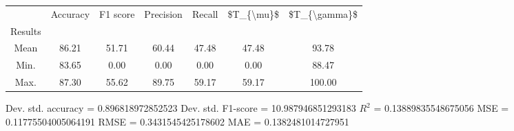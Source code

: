 \begin{tabular}{|c|c|c|c|c|c|c|}
\toprule
{} &  Accuracy &  F1 score &  Precision &  Recall &  \$T\_\{\textbackslash mu\}\$ &  \$T\_\{\textbackslash gamma\}\$ \\
Results &           &           &            &         &            &               \\
\hline
Mean    &     86.21 &     51.71 &      60.44 &   47.48 &      47.48 &         93.78 \\
Min.    &     83.65 &      0.00 &       0.00 &    0.00 &       0.00 &         88.47 \\
Max.    &     87.30 &     55.62 &      89.75 &   59.17 &      59.17 &        100.00 \\
\bottomrule
\end{tabular}

 Dev. std. accuracy = 0.896818972852523
 Dev. std. F1-score = 10.987946851293183
 $R^2$ = 0.13889835548675056
 MSE = 0.11775504005064191
 RMSE = 0.3431545425178602
 MAE = 0.1382481014727951